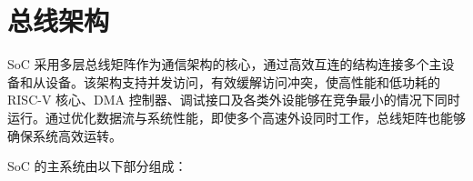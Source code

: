 \documentclass[main\_\_CN.tex]{subfiles}
\begin{document}
\setchineseformatting


\ifglobal
\else
    \clearpage
    \listoftodos
    \listofdonetodos
    \tableofcontents
\fi



\hypertarget{busarch}{}
\chapter{总线架构}
\label{mod:busarch}


\chipname{} SoC 采用多层总线矩阵作为通信架构的核心，通过高效互连的结构连接多个主设备和从设备。该架构支持并发访问，有效缓解访问冲突，使高性能和低功耗的 RISC-V 核心、DMA 控制器、调试接口及各类外设能够在竞争最小的情况下同时运行。通过优化数据流与系统性能，即使多个高速外设同时工作，总线矩阵也能够确保系统高效运转。

\chipname{} SoC 的主系统由以下部分组成：
\end{document}
